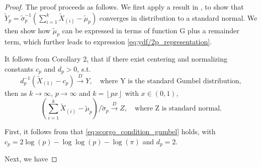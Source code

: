 \begin{proof}
	The proof proceeds as follows. We first apply a result in \citet{Csorgo1991}, to show that $\tilde{Y}_p=\tilde{\sigma}_p^{-1}(\sum_{i=1}^{k} \tilde{X}_{(i)}-\tilde{\mu}_p)$ converges in distribution to a standard normal. We then show how $\tilde{\mu}_p$ can be expressed in terms of function G plus a remainder term, which further leads to expression \eqref{eq:ydf/2p_representation}. 
	
	It follows from \cite{Csorgo1991} Corollary 2, that if there exist centering and normalizing constants $c_p$ and $d_p>0$, s.t.
	\begin{equation}
	d_p^{-1}(\tilde{X}_{(1)} - c_p) \xrightarrow{D} Y, \quad \text{where Y is the standard Gumbel distribution},
	\label{eq:scorgo_condition_gumbel} 
	\end{equation}
	then as $k \to \infty$, $p \to \infty$ and $k=\left \lfloor{px}\right \rfloor$ with $x \in (0,1)$,
	\begin{equation}
	(\sum_{i=1}^k \tilde{X}_{(i)}  - \tilde{\mu}_p) / \tilde{\sigma}_p \xrightarrow{D} Z, \quad \text{where Z is standard normal}.
	\label{eq:scorgo_result}
	\end{equation}
	
	First, it follows from \cite{Embrechts2013} that \eqref{eq:scorgo_condition_gumbel} holds, with $c_p=2\log(p)-\log\log(p)-\log(\pi)$ and $d_p=2$.
	\iffalse
	the maxima of $p$ Gamma-distributed random variables, $\Gamma(\alpha,\beta)$ with $\beta$ being the rate parameter, converges to a Gumbel distribution as $p \to \infty$, where the centering constant $c_p=\beta^{-1}(\log(p) +(\alpha-1)\log\log(p) - \log(\Gamma(\alpha)))$, and the scaling constant $d_p=\beta^{-1}$. Meanwhile, we know that $\chi^2_1$ is a $\Gamma(1/2,1/2)$ distribution. Therefore, \eqref{eq:scorgo_condition_gumbel} holds, where $c_p=2\log(p)-\log\log(p)-\log(\pi)$ and $d_p=2$.
	\fi
	
	Next, we have
	

\end{proof}
